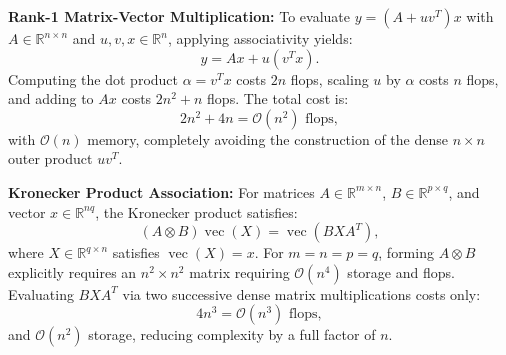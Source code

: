 \textbf{Rank-1 Matrix-Vector Multiplication:} To evaluate $y = (A + u v^T) x$ with $A \in \mathbb{R}^{n \times n}$ and $u, v, x \in \mathbb{R}^n$, applying associativity yields:
\begin{equation}
    y = A x + u (v^T x).
\end{equation}
Computing the dot product $\alpha = v^T x$ costs $2n$ flops, scaling $u$ by $\alpha$ costs $n$ flops, and adding to $A x$ costs $2n^2 + n$ flops. The total cost is:
\begin{equation}
    2n^2 + 4n = \mathcal{O}(n^2) \text{ flops},
\end{equation}
with $\mathcal{O}(n)$ memory, completely avoiding the construction of the dense $n \times n$ outer product $u v^T$.

\textbf{Kronecker Product Association:} For matrices $A \in \mathbb{R}^{m \times n}$, $B \in \mathbb{R}^{p \times q}$, and vector $x \in \mathbb{R}^{n q}$, the Kronecker product satisfies:
\begin{equation}
    (A \otimes B) \operatorname{vec}(X) = \operatorname{vec}(B X A^T),
\end{equation}
where $X \in \mathbb{R}^{q \times n}$ satisfies $\operatorname{vec}(X) = x$. For $m=n=p=q$, forming $A \otimes B$ explicitly requires an $n^2 \times n^2$ matrix requiring $\mathcal{O}(n^4)$ storage and flops. Evaluating $B X A^T$ via two successive dense matrix multiplications costs only:
\begin{equation}
    4n^3 = \mathcal{O}(n^3) \text{ flops},
\end{equation}
and $\mathcal{O}(n^2)$ storage, reducing complexity by a full factor of $n$.
